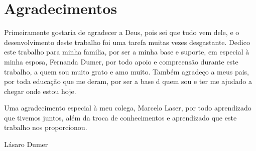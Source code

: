 \chapter*{Agradecimentos}

Primeiramente gostaria de agradecer a Deus, pois sei que tudo vem dele, e o desenvolvimento deste trabalho foi uma tarefa muitas vezes desgastante. Dedico este trabalho para minha familia, por ser a minha base e suporte, em especial à minha esposa, Fernanda Dumer, por todo apoio e compreensão durante este trabalho, a quem sou muito grato e amo muito. Também agradeço a meus pais, por toda educação que me deram, por ser a base d quem sou e ter me ajudado a chegar onde estou hoje.

Uma agradecimento especial à meu colega, Marcelo Laser, por todo aprendizado que tivemos juntos, além da troca de conhecimentos e aprendizado que este trabalho nos proporcionou.


\begin{flushright}
Lásaro Dumer    
\end{flushright}
